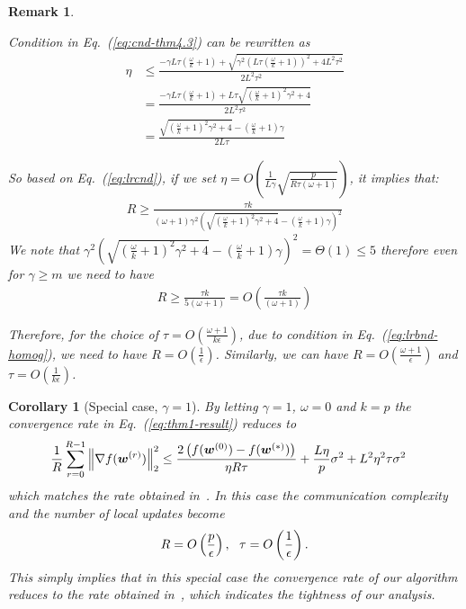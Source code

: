 \documentclass[twoside]{article}
\newtheorem{remark}{Remark}
\newtheorem{corollary}{Corollary}
\begin{document}
\begin{remark}\label{rmk:cnd-lr}

Condition in Eq.~(\ref{eq:cnd-thm4.3}) can be rewritten as 
\begin{align}
    \eta&\leq \frac{-\gamma L\tau\left(\frac{\omega}{k}+1\right)+\sqrt{\gamma^2 \left(L\tau\left(\frac{\omega}{k}+1\right)\right)^2+4L^2\tau^2}}{2L^2\tau^2}\nonumber\\
    &= \frac{-\gamma L\tau\left(\frac{\omega}{k}+1\right)+L\tau\sqrt{\left(\frac{\omega}{k}+1\right)^2\gamma^2 +4}}{2L^2\tau^2}\nonumber\\
    &=\frac{\sqrt{\left(\frac{\omega}{k}+1\right)^2\gamma^2 +4}-\left(\frac{\omega}{k}+1\right)\gamma}{2L\tau}\label{eq:lrcnd}
\end{align}

So based on Eq.~(\ref{eq:lrcnd}), if we set $\eta=O\left(\frac{1}{L\gamma}\sqrt{\frac{p}{R\tau\left(\omega+1\right)}}\right)$, it implies that:
\begin{align}
    R\geq \frac{\tau k}{\left(\omega+1\right)\gamma^2\left(\sqrt{\left(\frac{\omega}{k}+1\right)^2\gamma^2+4}-\left(\frac{\omega}{k}+1\right)\gamma\right)^2}\label{eq:iidexact}
\end{align}
We note that $\gamma^2\left(\sqrt{\left(\frac{\omega}{k}+1\right)^2\gamma^2+4}-\left(\frac{\omega}{k}+1\right)\gamma\right)^2=\Theta(1)\leq 5 $ therefore even for $\gamma\geq m$ we need to have 
\begin{align}
    R\geq \frac{\tau k}{5\left(\omega+1\right)}=O\left(\frac{\tau k}{\left(\omega+1\right)}\right)\label{eq:lrbnd-homog}
\end{align}

{Therefore, for the choice of $\tau=O\left(\frac{\omega+1}{k\epsilon}\right)$, due to condition in Eq.~(\ref{eq:lrbnd-homog}), we need to have $R=O\left(\frac{1}{\epsilon}\right)$. Similarly, we can have $R=O\left(\frac{\omega+1}{\epsilon}\right)$ and $\tau=O\left(\frac{1}{k\epsilon}\right)$.}


\end{remark}

\begin{corollary}[Special case, $\gamma=1$]
By letting $\gamma=1$, $\omega=0$ and $k=p$ the convergence rate in Eq.~(\ref{eq:thm1-result}) reduces to 
\begin{align}\notag
     \frac{1}{R}\sum_{r=0}^{R-1}\left\|\nabla f({\boldsymbol{w}}^{(r)})\right\|_2^2&\leq \frac{2\left(f(\boldsymbol{w}^{(0)})-f(\boldsymbol{w}^{(*)})\right)}{\eta R\tau}+\frac{L\eta }{p}\sigma^2+{L^2\eta^2\tau }\sigma^2
\end{align}
which matches the rate  obtained in~\cite{wang2018cooperative}. In this case the communication complexity and the number of local updates become 
\begin{align}\notag
    {R}=O\left(\frac{p}{\epsilon}\right), \:\:\: \tau=O\left(\frac{1}{\epsilon}\right).
\end{align}
This simply implies  that in this special case the convergence rate of our algorithm reduces to the  rate obtained in~\cite{wang2018cooperative}, which indicates the tightness of  our analysis.
\end{corollary}
\end{document}
